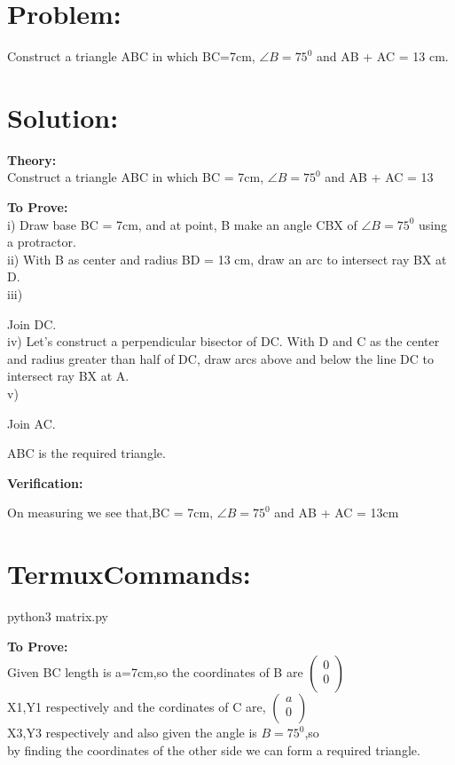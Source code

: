 \documentclass[10pt,a4paper]{report}
\begin{document}
\begin{multicols}{2}

\section{Problem:}  Construct a triangle ABC in which BC=7cm, $\angle{B}=75^0$ and AB + AC = 13 cm.\vspace{3mm}
 \section{Solution: }\vspace{3mm}
\raggedright \textbf{Theory:}\\
\centering Construct a triangle ABC in which BC = 7cm, $\angle{B}=75^0$ and AB + AC = 13 \\

\raggedright \textbf{To Prove:}\\
i) Draw base BC = 7cm, and at point, B make an angle CBX of $\angle{B}=75^0$ using \centering a protractor. \\ 
ii) With B as center and radius BD = 13 cm, draw an arc to intersect ray BX at D. \\
iii) \raggedright Join DC. \\
iv) Let's construct a perpendicular bisector of DC. With D and C as the center \centering and radius greater than half of DC, draw arcs above and below the line DC to intersect ray BX at A. \\
v) \raggedright Join AC. 

\centering ABC is the required triangle. 

\raggedright\textbf{Verification:} 

On measuring we see that,BC = 7cm, $\angle{B}=75^0$ and  AB + AC = 13cm  \\
   \section{TermuxCommands: } 
               \centering python3 matrix.py

\raggedright \textbf{To Prove:}\\
   Given BC length is a=7cm,so the coordinates of B are 
 $\begin{pmatrix}
  0\\
  0 \\
 \end{pmatrix}$%
 \\ X1,Y1 respectively and the cordinates of C are,
 $\begin{pmatrix}
  a\\
  0 \\
 \end{pmatrix}$%
 \\ X3,Y3 respectively and also given the angle is $B=75^0$,so \\ by finding the coordinates of the other side we can form a required triangle. \\


\end{multicols}
\end{document}
